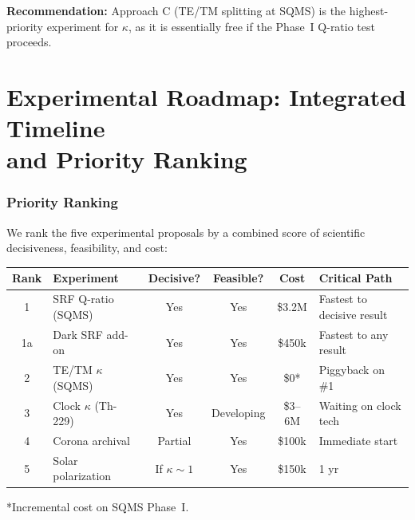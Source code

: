 \documentclass[11pt]{article}
\begin{document}
\textbf{Recommendation:}  Approach C (TE/TM splitting at SQMS) is
the highest-priority experiment for $\kappa$, as it is essentially
free if the Phase~I Q-ratio test proceeds.


\part{Experimental Roadmap: Integrated Timeline\\
and Priority Ranking}
\label{part:roadmap}


\section{Priority Ranking}
\label{sec:ranking}

We rank the five experimental proposals by a combined score of
scientific decisiveness, feasibility, and cost:

\begin{center}
\begin{tabular}{clcccl}
\toprule
\textbf{Rank} & \textbf{Experiment} & \textbf{Decisive?}
& \textbf{Feasible?} & \textbf{Cost} & \textbf{Critical Path} \\
\midrule
1 & SRF Q-ratio (SQMS) & Yes & Yes & \$3.2M & Fastest to decisive result \\
1a & Dark SRF add-on & Yes & Yes & \$450k & Fastest to any result \\
2 & TE/TM $\kappa$ (SQMS) & Yes & Yes & \$0* & Piggyback on \#1 \\
3 & Clock $\kappa$ (Th-229) & Yes & Developing & \$3--6M & Waiting on clock tech \\
4 & Corona archival & Partial & Yes & \$100k & Immediate start \\
5 & Solar polarization & If $\kappa\sim 1$ & Yes & \$150k & 1 yr \\
\bottomrule
\end{tabular}
\end{center}
*Incremental cost on SQMS Phase~I.

\end{document}
